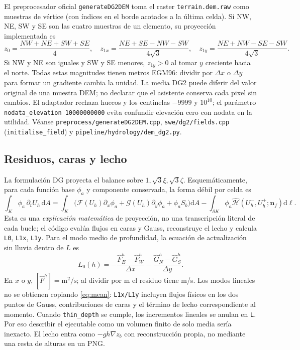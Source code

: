 \documentclass[11pt,a4paper]{article}
\newcommand{\src}[1]{\nolinkurl{#1}}
\newcommand{\dd}{\mathrm d}
\newcommand{\unit}[1]{\mathrm{#1}}
\begin{document}
El preprocesador oficial \texttt{generateDG2DEM} toma el raster \texttt{terrain.dem.raw} como muestras de vértice (con índices en el borde acotados a la última celda). Si NW, NE, SW y SE son las cuatro muestras de un elemento, su proyección implementada es
\begin{equation}
 z_0=\frac{NW+NE+SW+SE}{4},\quad
 z_{1x}=\frac{NE+SE-NW-SW}{4\sqrt3},\quad
 z_{1y}=\frac{NE+NW-SE-SW}{4\sqrt3}.\label{eq:vertices}
\end{equation}
Si NW y NE son iguales y SW y SE menores, $z_{1y}>0$ al tomar $y$ creciente hacia el norte. Todas estas magnitudes tienen metros EGM96: dividir por $\Delta x$ o $\Delta y$ para formar un gradiente cambia la unidad. La media DG2 puede diferir del valor original de una muestra DEM; no declarar que el asistente conserva cada pixel sin cambios. El adaptador rechaza huecos y los centinelas $-9999$ y $10^{10}$; el parámetro \texttt{nodata\_elevation 10000000000} evita confundir elevación cero con nodata en la utilidad. Véanse \src{preprocess/generateDG2DEM.cpp}, \src{swe/dg2/fields.cpp} (\texttt{initialise\_field}) y \src{pipeline/hydrology/dem_dg2.py}.

\subsection{Residuos, caras y lecho}
La formulación DG proyecta el balance sobre $1,\sqrt3\xi,\sqrt3\zeta$. Esquemáticamente, para cada función base $\phi_a$ y componente conservada, la forma débil por celda es
\begin{equation}
 \int_K \phi_a\,\partial_t U_h\,\dd A =
 \int_K\!\bigl(\mathcal F(U_h)\partial_x\phi_a+\mathcal G(U_h)\partial_y\phi_a+\phi_a S_b\bigr)\dd A
 -\int_{\partial K}\!\phi_a\widehat{\mathcal H}(U_h^-,U_h^+;\boldsymbol n_{\!f})\dd\ell.
 \label{eq:weak}
\end{equation}
Esta es una \emph{explicación matemática} de proyección, no una transcripción literal de cada bucle; el código evalúa flujos en caras y Gauss, reconstruye el lecho y calcula \texttt{L0}, \texttt{L1x}, \texttt{L1y}. Para el modo medio de profundidad, la ecuación de actualización sin lluvia dentro de $L$ es
\begin{equation}
 L_0(h)=-\frac{\widehat F^h_E-\widehat F^h_W}{\Delta x}
          -\frac{\widehat G^h_N-\widehat G^h_S}{\Delta y}.\label{eq:mean}
\end{equation}
En $x$ o $y$, $[\widehat F^h]=\unit{m^2/s}$; al dividir por m el residuo tiene m/s. Los modos lineales no se obtienen copiando \eqref{eq:mean}: \texttt{L1x/L1y} incluyen flujos físicos en los dos puntos de Gauss, contribuciones de caras y el término de lecho correspondiente al momento. Cuando \texttt{thin\_depth} se cumple, los incrementos lineales se anulan en \texttt{L}. Por eso describir el ejecutable como un volumen finito de solo media sería inexacto. El lecho entra como $-gh\nabla z_b$ con reconstrucción propia, no mediante una resta de alturas en un PNG.
\end{document}
